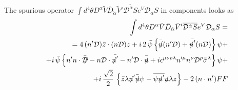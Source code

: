 \documentclass[a4paper,12pt]{article}
\newcommand{\slashed}[1]{\hbox{{$#1$}\llap{$/$}}}
\begin{document}
   The spurious operator 
$	\int d^4 \theta 
    D^\alpha \tilde{V} \bar{D}_{\dot{\alpha}} \tilde{V}'
    \overline{ {\mathcal D}^{\dot{\alpha}} S } e^V
    {\mathcal D}_\alpha S $ 
   in components looks as
\begin{eqnarray*}
&&
	\int d^4 \theta 
    D^\alpha \tilde{V} \bar{D}_{\dot{\alpha}} \tilde{V}'
    \overline{ {\mathcal D}^{\dot{\alpha}} S } e^V
    {\mathcal D}_\alpha S = \\
&&
  = 4 \, ( n' {\mathcal D} ) \bar{z} \cdot ( n {\mathcal D} ) z 
  + i \, 2 \, \bar{\psi} \left \{
           \bar{\slashed{n}} (n' {\mathcal D}) +
          \bar{\slashed{n}'} (n {\mathcal D}) 
                   \right \} \psi + \\
&&
  + i \, \bar{\psi} \left \{
       n' n \cdot \bar{\slashed{\mathcal D}} 
    -  n {\mathcal D} \cdot \bar{\slashed{n}'}
    -  n' {\mathcal D} \cdot \bar{\slashed{n}} 
    +  i \epsilon^{\mu\nu\rho\lambda} 
       n'^\mu n^\nu {\mathcal D}^\rho \bar{\sigma}^\lambda
                 \right \} \psi + \\
&&
  + i \, \frac{\sqrt{2}}{2} \, \left \{
       \bar{z} \lambda \slashed{n}' \bar{\slashed{n}} \psi 
    -  \overline{ \psi \slashed{n}' } \slashed{n} \bar{\lambda} z
                 \right \}
  -  2 \, (n \cdot n') \bar{F} F
\end{eqnarray*}
\end{document}
